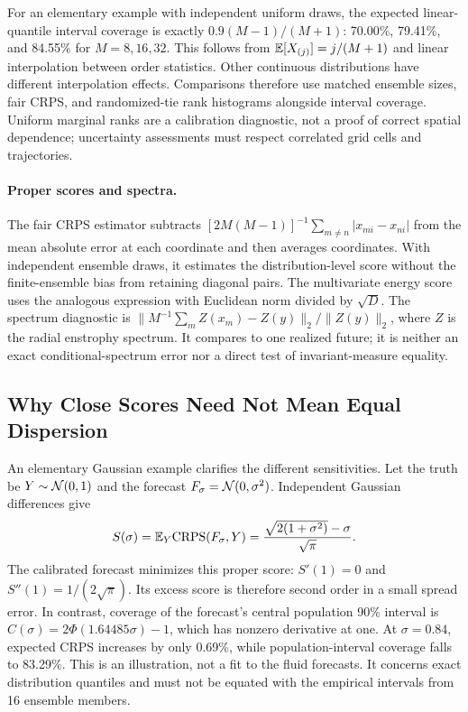 For an elementary example with independent uniform draws, the expected linear-quantile interval coverage is exactly $0.9(M-1)/(M+1)$: 70.00\%, 79.41\%, and 84.55\% for $M=8,16,32$. This follows from $\mathbb{E}[X_{(j)}]=j/(M+1)$ and linear interpolation between order statistics. Other continuous distributions have different interpolation effects. Comparisons therefore use matched ensemble sizes, fair CRPS, and randomized-tie rank histograms alongside interval coverage. Uniform marginal ranks are a calibration diagnostic, not a proof of correct spatial dependence; uncertainty assessments must respect correlated grid cells and trajectories.

\paragraph{Proper scores and spectra.} The fair CRPS estimator subtracts $[2M(M-1)]^{-1}\sum_{m\ne n}|x_{mi}-x_{ni}|$ from the mean absolute error at each coordinate and then averages coordinates. With independent ensemble draws, it estimates the distribution-level score without the finite-ensemble bias from retaining diagonal pairs. The multivariate energy score uses the analogous expression with Euclidean norm divided by $\sqrt D$. The spectrum diagnostic is $\|M^{-1}\sum_m Z(x_m)-Z(y)\|_2/\|Z(y)\|_2$, where $Z$ is the radial enstrophy spectrum. It compares to one realized future; it is neither an exact conditional-spectrum error nor a direct test of invariant-measure equality.

\subsection{Why Close Scores Need Not Mean Equal Dispersion}
An elementary Gaussian example clarifies the different sensitivities. Let the truth be $Y\sim\mathcal{N}(0,1)$ and the forecast $F_\sigma=\mathcal{N}(0,\sigma^2)$. Independent Gaussian differences give
\begin{equation}
 S(\sigma)=\mathbb{E}_Y\mathrm{CRPS}(F_\sigma,Y)
 =\frac{\sqrt{2(1+\sigma^2)}-\sigma}{\sqrt\pi}.
\end{equation}
The calibrated forecast minimizes this proper score: $S'(1)=0$ and $S''(1)=1/(2\sqrt\pi)$. Its excess score is therefore second order in a small spread error. In contrast, coverage of the forecast's central population 90\% interval is $C(\sigma)=2\Phi(1.64485\sigma)-1$, which has nonzero derivative at one. At $\sigma=0.84$, expected CRPS increases by only 0.69\%, while population-interval coverage falls to 83.29\%. This is an illustration, not a fit to the fluid forecasts. It concerns exact distribution quantiles and must not be equated with the empirical intervals from 16 ensemble members.
